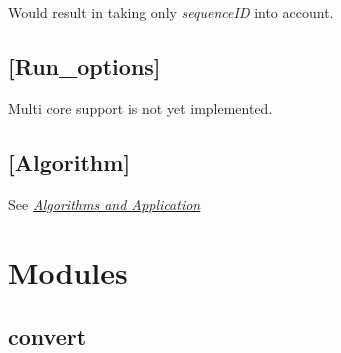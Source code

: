 \documentclass[letterpaper,10pt,english]{sphinxmanual}
\begin{document}
Would result in taking only \emph{sequenceID} into account.


\section{{[}Run\_options{]}}
\label{ConfigurationFiles:run-options}
Multi core support is not yet implemented.


\section{{[}Algorithm{]}}
\label{ConfigurationFiles:algorithm}
See {\hyperref[Introduction:algo]{\emph{Algorithms and Application}}}


\chapter{Modules}
\label{Modules:modules}\label{Modules::doc}

\section{convert}
\label{Modules:convert}\label{Modules:module-scythe2.convert}\label{Modules:module-scythe2.convert.scythe_loc_gff}

\begin{fulllineitems}
\label{Modules:scythe2.convert.scythe_loc_gff.checkGff3}
\end{fulllineitems}


\begin{fulllineitems}
\label{Modules:scythe2.convert.scythe_loc_gff.formatHelp}
\end{fulllineitems}


\begin{fulllineitems}
\label{Modules:scythe2.convert.scythe_loc_gff.main}
\end{fulllineitems}
\end{document}
